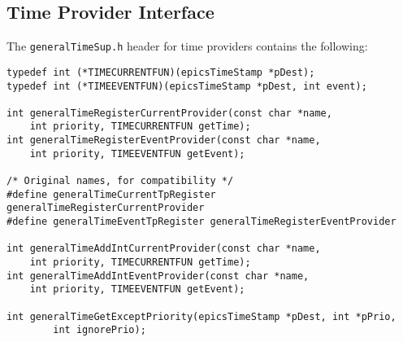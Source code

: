 \subsection{Time Provider Interface}

The \verb|generalTimeSup.h| header for time providers contains the following:

\begin{verbatim}
typedef int (*TIMECURRENTFUN)(epicsTimeStamp *pDest);
typedef int (*TIMEEVENTFUN)(epicsTimeStamp *pDest, int event);

int generalTimeRegisterCurrentProvider(const char *name,
    int priority, TIMECURRENTFUN getTime);
int generalTimeRegisterEventProvider(const char *name,
    int priority, TIMEEVENTFUN getEvent);

/* Original names, for compatibility */
#define generalTimeCurrentTpRegister generalTimeRegisterCurrentProvider
#define generalTimeEventTpRegister generalTimeRegisterEventProvider

int generalTimeAddIntCurrentProvider(const char *name,
    int priority, TIMECURRENTFUN getTime);
int generalTimeAddIntEventProvider(const char *name,
    int priority, TIMEEVENTFUN getEvent);

int generalTimeGetExceptPriority(epicsTimeStamp *pDest, int *pPrio,
        int ignorePrio);
\end{verbatim}

